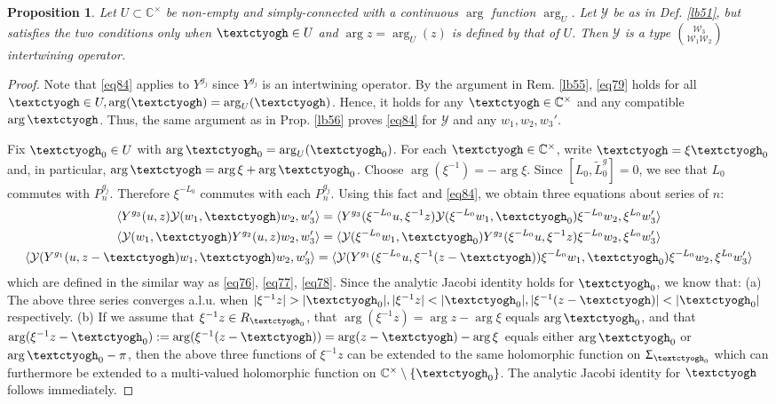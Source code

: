\documentclass[11pt,b5paper,notitlepage]{article}
\theoremstyle{definition}
\theoremstyle{plain}
\newtheorem{pp}[df]{Proposition}
\newcommand{\mc}{\mathcal}
\newcommand{\wtd}{\widetilde}
\newcommand{\bk}[1]{\langle {#1}\rangle}
\newcommand{\Cbb}{\mathbb C}
\newcommand{\tipaz}{\text{\textctyogh}}
\numberwithin{equation}{subsection}
\begin{document}
\begin{pp}\label{lb57}
Let $U\subset\Cbb^\times$ be non-empty and simply-connected with a continuous $\arg$ function $\arg_U$. Let $\mc Y$ be as in Def. \ref{lb51}, but satisfies the two conditions only when $\tipaz\in U$ and $\arg z=\arg_U(z)$ is defined by that of $U$. Then $\mc Y$ is a type $\mc W_3\choose\mc W_1\mc W_2$ intertwining operator.
\end{pp}





\begin{proof}
Note that \eqref{eq84} applies to $Y^{g_j}$ since $Y^{g_j}$ is an intertwining operator. By the argument in Rem. \ref{lb55}, \eqref{eq79} holds  for all $\tipaz\in U,\arg(\tipaz)=\arg_U(\tipaz)$. Hence, it holds for any $\tipaz\in\Cbb^\times$ and any compatible $\arg\tipaz$. Thus, the same argument as in Prop. \ref{lb56} proves \eqref{eq84} for $\mc Y$ and any $w_1,w_2,w_3'$.

Fix $\tipaz_0\in U$ with $\arg\tipaz_0=\arg_U(\tipaz_0)$. For each $\tipaz\in\Cbb^\times$, write $\tipaz=\xi\tipaz_0$ and, in particular, $\arg\tipaz=\arg\xi+\arg\tipaz_0$. Choose $\arg(\xi^{-1})=-\arg\xi$. Since $[L_0,\wtd L_0^g]=0$, we see that $L_0$ commutes with $P_n^{g_j}$. Therefore $\xi^{-L_0}$ commutes with each $P_n^{g_j}$. Using this fact and \eqref{eq84}, we obtain three equations about series of $n$:
\begin{gather*}
\bk{Y^{g_3}(u,z)\mc Y(w_1,\tipaz)w_2,w_3'}=\bk{Y^{g_3}(\xi^{-L_0}u,\xi^{-1}z)\mc Y(\xi^{-L_0}w_1,\tipaz_0)\xi^{-L_0}w_2,\xi^{L_0}w_3'}\\
\bk{\mc Y(w_1,\tipaz)Y^{g_2}(u,z)w_2,w_3'}=\bk{\mc Y(\xi^{-L_0}w_1,\tipaz_0)Y^{g_2}(\xi^{-L_0}u,\xi^{-1}z)\xi^{-L_0}w_2,\xi^{L_0}w_3'}\\
\bk{\mc Y(Y^{g_1}(u,z-\tipaz)w_1,\tipaz)w_2,w'_3}=\bk{\mc Y(Y^{g_1}(\xi^{-L_0}u,\xi^{-1}(z-\tipaz))\xi^{-L_0}w_1,\tipaz_0)\xi^{-L_0}w_2,\xi^{L_0}w'_3}	
\end{gather*}
which are defined in the similar way as \eqref{eq76}, \eqref{eq77}, \eqref{eq78}. Since the analytic Jacobi identity holds for $\tipaz_0$, we know that: (a) The above three series converges a.l.u. when $|\xi^{-1}z|>|\tipaz_0|,|\xi^{-1}z|<|\tipaz_0|,|\xi^{-1}(z-\tipaz)|<|\tipaz_0|$ respectively. (b) If we assume that $\xi^{-1}z\in R_{\tipaz_0}$, that $\arg(\xi^{-1}z)=\arg z-\arg\xi$ equals $\arg\tipaz_0$, and that $\arg(\xi^{-1}z-\tipaz_0):=\arg(\xi^{-1}(z-\tipaz))=\arg(z-\tipaz)-\arg\xi$ equals either $\arg \tipaz_0$ or $\arg\tipaz_0-\pi$, then the above three functions of $\xi^{-1}z$ can be extended to  the same holomorphic function on $\Upsigma_{\tipaz_0}$ which can furthermore be extended to a multi-valued holomorphic function on $\Cbb^\times\setminus\{\tipaz_0\}$. The analytic Jacobi identity for $\tipaz$ follows immediately.
\end{proof}
\end{document}
